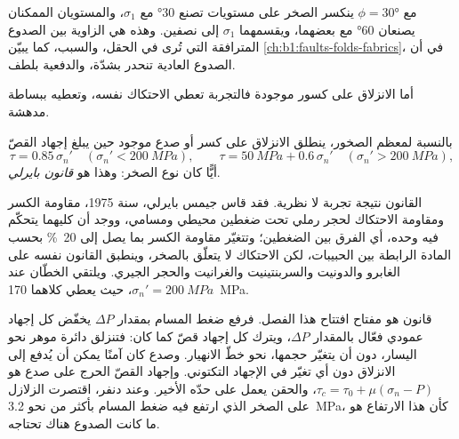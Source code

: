 مع $\phi = \ang{30}$ ينكسر الصخر على مستويات تصنع \ang{30} مع $\sigma_1$، والمستويان الممكنان يصنعان \ang{60} مع بعضهما، ويقسمهما $\sigma_1$ إلى نصفين. وهذه هي الزاوية بين الصدوع المترافقة التي تُرى في الحقل، والسبب، كما يبيّن \cref{ch:b1:faults-folds-fabrics}، في أن الصدوع العادية تنحدر بشدّة، والدفعية بلطف.

أما الانزلاق على كسور موجودة فالتجربة تعطي الاحتكاك نفسه، وتعطيه ببساطة مدهشة.

\begin{proposition}\label{prop:b1:stress-strain-rheology:byerlee}
بالنسبة لمعظم الصخور، ينطلق الانزلاق على كسر أو صدع موجود حين يبلغ إجهاد القصّ
\[
  \tau = 0.85\,\sigma_n' \quad (\sigma_n' < \qty{200}{MPa}), \qquad
  \tau = \qty{50}{MPa} + 0.6\,\sigma_n' \quad (\sigma_n' > \qty{200}{MPa}),
\]
أيًّا كان نوع الصخر: وهذا هو \emph{قانون بايرلي}.
\end{proposition}
\admitted

القانون نتيجة تجربة لا نظرية. فقد قاس جيمس بايرلي، سنة 1975، مقاومة الكسر ومقاومة الاحتكاك لحجر رملي تحت ضغطين محيطي ومسامي، ووجد أن كليهما يتحكّم فيه  وحده، أي الفرق بين الضغطين؛ وتتغيّر مقاومة الكسر بما يصل إلى \qty{20}{\percent} بحسب المادة الرابطة بين الحبيبات، لكن الاحتكاك لا يتعلّق بالصخر، وينطبق القانون نفسه على الغابرو والدونيت والسربنتينيت والغرانيت والحجر الجيري. ويلتقي الخطّان عند $\sigma_n' = \qty{200}{MPa}$، حيث يعطي كلاهما \qty{170}{MPa}.

قانون  هو مفتاح افتتاح هذا الفصل. فرفع ضغط المسام بمقدار $\Delta P$ يخفّض كل إجهاد عمودي فعّال بالمقدار $\Delta P$، ويترك كل إجهاد قصّ كما كان: فتنزلق دائرة موهر نحو اليسار، دون أن يتغيّر حجمها، نحو خطّ الانهيار. وصدع كان آمنًا يمكن أن يُدفع إلى الانزلاق دون أي تغيّر في الإجهاد التكتوني. وإجهاد القصّ الحرج على صدع هو $\tau_c = \tau_0 + \mu(\sigma_n - P)$، والحقن يعمل على حدّه الأخير. وعند دنفر، اقتصرت الزلازل على الصخر الذي ارتفع فيه ضغط المسام بأكثر من نحو \qty{3.2}{MPa}، كأن هذا الارتفاع هو ما كانت الصدوع هناك تحتاجه.

